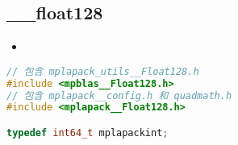
\begin{issues}
\issueDraft
\end{issues}


\subsection{__float128}
\begin{itemize}
\item 
\end{itemize}

\begin{lstlisting}[language=cpp]
// 包含 mplapack_utils__Float128.h
#include <mpblas__Float128.h>
// 包含 mplapack__config.h 和 quadmath.h
#include <mplapack__Float128.h>

typedef int64_t mplapackint;
\end{lstlisting}
